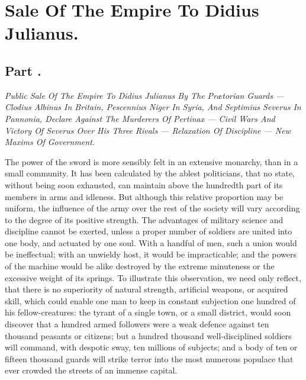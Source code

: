 \chapter{Sale Of The Empire To Didius Julianus.}
\section{Part \thesection.}

\textit{Public Sale Of The Empire To Didius Julianus By The Prætorian
Guards — Clodius Albinus In Britain, Pescennius Niger In Syria, And
Septimius Severus In Pannonia, Declare Against The Murderers Of
Pertinax — Civil Wars And Victory Of Severus Over His Three
Rivals — Relaxation Of Discipline — New Maxims Of Government.}
\vspace{\onelineskip}

The power of the sword is more sensibly felt in an extensive
monarchy, than in a small community. It has been calculated by
the ablest politicians, that no state, without being soon
exhausted, can maintain above the hundredth part of its members
in arms and idleness. But although this relative proportion may
be uniform, the influence of the army over the rest of the
society will vary according to the degree of its positive
strength. The advantages of military science and discipline
cannot be exerted, unless a proper number of soldiers are united
into one body, and actuated by one soul. With a handful of men,
such a union would be ineffectual; with an unwieldy host, it
would be impracticable; and the powers of the machine would be
alike destroyed by the extreme minuteness or the excessive weight
of its springs. To illustrate this observation, we need only
reflect, that there is no superiority of natural strength,
artificial weapons, or acquired skill, which could enable one man
to keep in constant subjection one hundred of his
fellow-creatures: the tyrant of a single town, or a small
district, would soon discover that a hundred armed followers were
a weak defence against ten thousand peasants or citizens; but a
hundred thousand well-disciplined soldiers will command, with
despotic sway, ten millions of subjects; and a body of ten or
fifteen thousand guards will strike terror into the most numerous
populace that ever crowded the streets of an immense capital.

